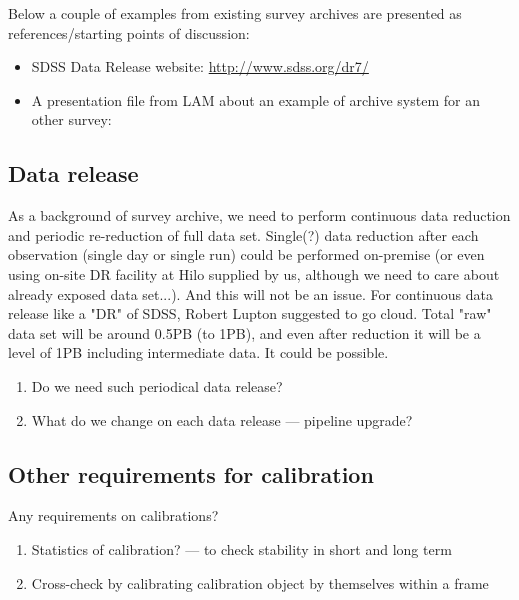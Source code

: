 \documentclass[a4paper,notitlepage]{article}
\begin{document}
Below a couple of examples from existing survey archives are presented
as references/starting points of discussion:
\begin{itemize}
 \item SDSS Data Release website: \url{http://www.sdss.org/dr7/}
 \item A presentation file from LAM about an example of archive system
       for an other survey: 
\end{itemize}

\subsection{Data release}

As a background of survey archive, we need to perform continuous data
reduction and periodic re-reduction of full data set.  Single(?) data
reduction after each observation (single day or single run) could be
performed on-premise (or even using on-site DR facility at Hilo supplied
by us, although we need to care about already exposed data set...).  And
this will not be an issue. For continuous data release like a "DR" of
SDSS, Robert Lupton suggested to go cloud. Total "raw" data set will be
around 0.5PB (to 1PB), and even after reduction it will be a level of
1PB including intermediate data.  It could be possible.

\begin{enumerate}
  \item[\cols{a}] Do we need such periodical data release?
  \item[\colm{b}] What do we change on each data release --- pipeline upgrade?
\end{enumerate}


\subsection{Other requirements for calibration}

Any requirements on calibrations?

\begin{enumerate}
  \item[\colm{a}] Statistics of calibration? --- to check stability in short and long 
    term
  \item[\colm{b}] Cross-check by calibrating calibration object by themselves within a 
    frame
\end{enumerate}
\end{document}
